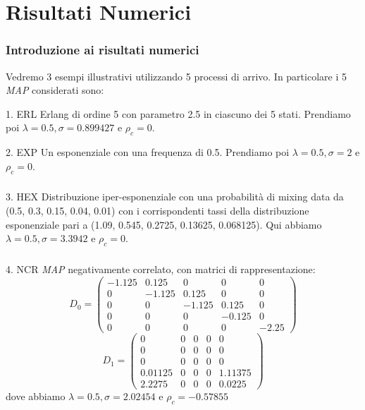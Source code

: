 \documentclass{beamer}
\begin{document}
\section{Risultati Numerici}
\begin{frame}
    \frametitle{Introduzione ai risultati numerici}
    Vedremo 3 esempi illustrativi utilizzando 5 processi di arrivo. In particolare i 5 \emph{MAP} considerati sono:
    \begin{block}{1. ERL}
        Erlang di ordine 5 con parametro 2.5 in ciascuno dei 5 stati. Prendiamo poi $\lambda = 0.5, \sigma = 0.899427$ e $\rho_c = 0$.
    \end{block}
    \begin{block}{2. EXP}
        Un esponenziale con una frequenza di 0.5. Prendiamo poi $\lambda = 0.5, \sigma = 2$ e $\rho_c = 0$.
    \end{block}
\end{frame}


\begin{frame}
    \frametitle{}
    \begin{block}{3. HEX}
        Distribuzione iper-esponenziale con una probabilità di mixing data da (0.5, 0.3, 0.15, 0.04, 0.01) con i corrispondenti tassi della distribuzione esponenziale pari a (1.09, 0.545, 0.2725, 0.13625, 0.068125). Qui abbiamo $\lambda = 0.5, \sigma = 3.3942$ e $\rho_c = 0$.
    \end{block}
\end{frame}


\begin{frame}
    \frametitle{}
    \begin{block}{4. NCR}
        \emph{MAP} negativamente correlato, con matrici di rappresentazione:
        \small{\begin{equation*}
            D_0 =
            \begin{pmatrix}
                -1.125 & 0.125 & 0 & 0 & 0 \\
                0 & -1.125 & 0.125 & 0 & 0 \\
                0 & 0 & -1.125 & 0.125 & 0 \\
                0 & 0 & 0 & -0.125 & 0 \\
                0 & 0 & 0 & 0 & -2.25
            \end{pmatrix}
        \end{equation*}
        \begin{equation*}
            D_1 =
            \begin{pmatrix}
                0 & 0 & 0 & 0 & 0 \\
                0 & 0 & 0 & 0 & 0 \\
                0 & 0 & 0 & 0 & 0 \\
                0.01125 & 0 & 0 & 0 & 1.11375 \\
                2.2275 & 0 & 0 & 0 & 0.0225
            \end{pmatrix}
        \end{equation*}}
        dove abbiamo $\lambda = 0.5, \sigma = 2.02454$ e $\rho_c =  -0.57855$
    \end{block}
\end{frame}
\end{document}
